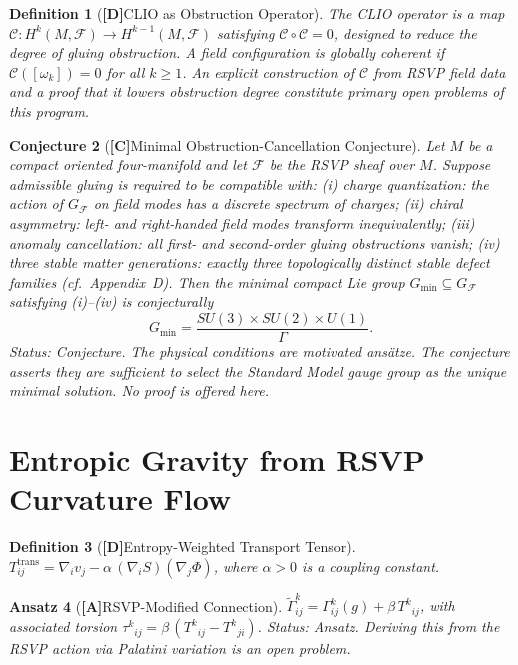 \documentclass[12pt,a4paper]{article}
\newcommand{\claimD}{\textbf{[D]}\;}
\newcommand{\claimA}{\textbf{[A]}\;}
\newcommand{\claimC}{\textbf{[C]}\;}
\newtheorem{defn}{Definition}[section]
\newtheorem{appansatz}[defn]{Ansatz}
\newtheorem{appconj}[defn]{Conjecture}
\begin{document}
\begin{defn}[\claimD CLIO as Obstruction Operator]
The CLIO operator is a map
$\mathcal{C}: H^k(M,\mathcal{F})\to H^{k-1}(M,\mathcal{F})$
satisfying $\mathcal{C}\circ\mathcal{C} = 0$, designed to reduce the degree of
gluing obstruction. A field configuration is globally coherent if
$\mathcal{C}([\omega_k]) = 0$ for all $k\geq 1$. An explicit construction of
$\mathcal{C}$ from RSVP field data and a proof that it lowers obstruction degree
constitute primary open problems of this program.
\end{defn}

\begin{appconj}[\claimC Minimal Obstruction-Cancellation Conjecture]
Let $M$ be a compact oriented four-manifold and let $\mathcal{F}$ be the RSVP
sheaf over $M$. Suppose admissible gluing is required to be compatible with:
(i) \emph{charge quantization}: the action of $G_{\mathcal{F}}$ on field modes
has a discrete spectrum of charges; (ii) \emph{chiral asymmetry}: left- and
right-handed field modes transform inequivalently; (iii) \emph{anomaly
cancellation}: all first- and second-order gluing obstructions vanish; (iv)
\emph{three stable matter generations}: exactly three topologically distinct
stable defect families (cf.\ Appendix~D). Then the minimal compact Lie group
$G_{\min}\subseteq G_{\mathcal{F}}$ satisfying (i)--(iv) is conjecturally
\[
  G_{\min} = \frac{SU(3)\times SU(2)\times U(1)}{\Gamma}.
\]
\emph{Status: Conjecture.} The physical conditions are motivated ans\"{a}tze.
The conjecture asserts they are sufficient to select the Standard Model gauge
group as the unique minimal solution. No proof is offered here.
\end{appconj}

\section{Entropic Gravity from RSVP Curvature Flow}

\begin{defn}[\claimD Entropy-Weighted Transport Tensor]
$T_{ij}^{\mathrm{trans}} = \nabla_i v_j - \alpha\,(\nabla_i S)(\nabla_j\Phi)$,
where $\alpha > 0$ is a coupling constant.
\end{defn}

\begin{appansatz}[\claimA RSVP-Modified Connection]
$\widetilde{\Gamma}^k_{ij} = \Gamma^k_{ij}(g) + \beta\,T^k{}_{ij}$,
with associated torsion
$\tau^k{}_{ij} = \beta\,(T^k{}_{ij} - T^k{}_{ji})$.
\emph{Status: Ansatz.} Deriving this from the RSVP action via Palatini variation
is an open problem.
\end{appansatz}
\end{document}
